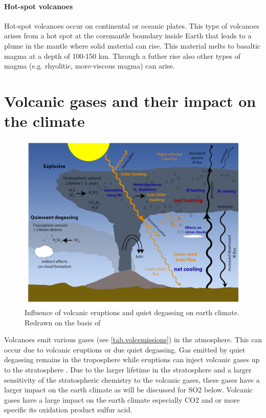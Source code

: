 \documentclass  [
  paper    = a4,
  BCOR     = 10mm,
  twoside,
  fontsize = 12pt,
  fleqn,
  toc      = bibnumbered,
  toc      = listofnumbered,
  numbers  = noendperiod,
  headings = normal,
  listof   = leveldown,
  version  = 3.03
]                                       {scrreprt}
\begin{document}
\paragraph{ Hot-spot volcanoes} Hot-spot volcanoes occur on continental or oceanic plates. This type of volcanoes arises from a hot spot at the coremantle boundary inside Earth that leads to a plume in the mantle where solid material can rise. This material melts to basaltic magma at a depth of 100-150 km. Through a futher rise also other types of magma (e.g. rhyolitic, more-viscous magma) can arise.


\section{Volcanic gases and their impact on the climate}
\begin{figure}
	\centering
	\includegraphics[width=0.8\linewidth]{Bilder/Simon/Bilder_Tung/Climate_Influence}
	\caption{Influence of volcanic eruptions and quiet degassing on earth climate. Redrawn on the basis of \cite{robock2000volcanic}}
	\label{fig:climateinfluence}
\end{figure}
Volcanoes emit various gases (see \cref{tab.volcemissions}) in the atmosphere. This can occur due to volcanic eruptions or due quiet degassing. Gas emitted by quiet degassing remains in the troposphere while eruptions can inject volcanic gases up to the stratosphere \citet{robock2000volcanic}. Due to the larger lifetime in the stratosphere and a larger sensitivity of the stratospheric chemistry to the volcanic gases, these gases have a larger impact on the earth climate as will be discussed for SO2 below.
Volcanic gases have a large impact on the earth climate especially CO2 and   or more specific its oxidation product sulfur acid.\\ 
\end{document}
